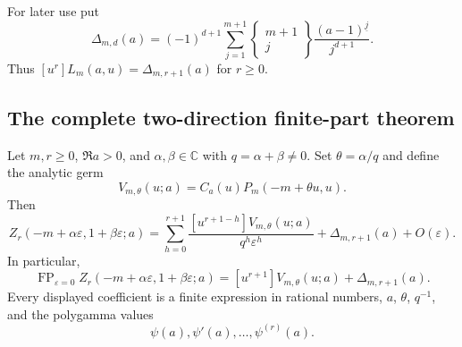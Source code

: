 For later use put
\begin{equation}\label{h2:eq:Delta}
 \Delta_{m,d}(a)=(-1)^{d+1}\sum_{j=1}^{m+1}
  \left\{\begin{matrix}m+1\\j\end{matrix}\right\}
                      \frac{(a-1)^{\underline j}}{j^{d+1}}.
\end{equation}
Thus $[u^r]L_m(a,u)=\Delta_{m,r+1}(a)$ for $r\ge0$.

\subsection{The complete two-direction finite-part theorem}

\begin{theorem}
\label{h2:thm:direction}
Let $m,r\ge0$, $\Re a>0$, and $\alpha,\beta\in\mathbb C$ with
$q=\alpha+\beta\ne0$. Set $\theta=\alpha/q$ and define the analytic
germ
\begin{equation}\label{h2:eq:V}
 V_{m,\theta}(u;a)=C_a(u)P_m(-m+\theta u,u).
\end{equation}
Then
\begin{equation}\label{h2:eq:main}
 \boxed{\displaystyle
 Z_r(-m+\alpha\varepsilon,1+\beta\varepsilon;a)
 =\sum_{h=0}^{r+1}
     \frac{[u^{r+1-h}]V_{m,\theta}(u;a)}
          {q^h\varepsilon^h}
      +\Delta_{m,r+1}(a)+O(\varepsilon).}
\end{equation}
In particular,
\begin{equation}\label{h2:eq:FP}
 \operatorname{FP}_{\varepsilon=0}
 Z_r(-m+\alpha\varepsilon,1+\beta\varepsilon;a)
 =[u^{r+1}]V_{m,\theta}(u;a)+\Delta_{m,r+1}(a).
\end{equation}
Every displayed coefficient is a finite expression in rational numbers,
$a$, $\theta$, $q^{-1}$, and the polygamma values
\[
 \psi(a),\psi'(a),\ldots,\psi^{(r)}(a).
\]
\end{theorem}
